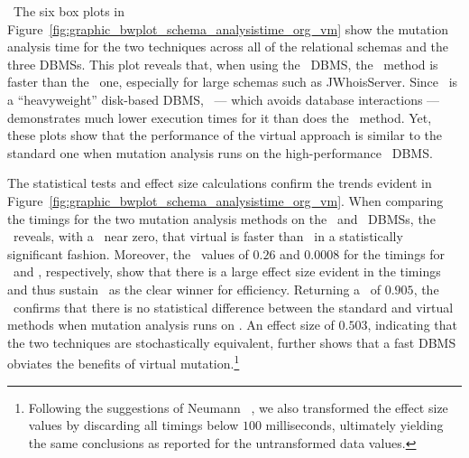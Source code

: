 

~The six box plots in Figure~\ref{fig:graphic_bwplot_schema_analysistime_org_vm} show the mutation analysis time for the two techniques across all of the relational schemas and the three DBMSs. This plot reveals that, when using the \HyperSQL~DBMS, the \virtual~method is faster than the \Original~one, especially for large schemas such as JWhoisServer. Since \Postgres~is a ``heavyweight'' disk-based DBMS, \vma~--- which avoids database interactions --- demonstrates much lower execution times for it than does the \Original~method. Yet, these plots show that the performance of the virtual approach is similar to the standard one when mutation analysis runs on the high-performance \sqlite~DBMS.


The statistical tests and effect size calculations confirm the trends evident in Figure~\ref{fig:graphic_bwplot_schema_analysistime_org_vm}. When comparing the timings for the two mutation analysis methods on the \HyperSQL~and \Postgres~DBMSs, the \wilcoxon~reveals, with a \pvalue~near zero, that virtual is faster than \Original~in a statistically significant fashion. Moreover, the \atwelve~values of $0.26$ and $0.0008$ for the timings for \HyperSQL~and \Postgres, respectively, show that there is a large effect size evident in the timings and thus sustain \vma~as the clear winner for efficiency. Returning a \pvalue~of $0.905$, the \wilcoxon~confirms that there is no statistical difference between the standard and virtual methods when mutation analysis runs on \sqlite. An effect size of $0.503$, indicating that the two techniques are stochastically equivalent, further shows that a fast DBMS obviates the benefits of virtual mutation.\footnote{{\scriptsize Following the suggestions of Neumann \etal~\cite{Neumann2015}, we also transformed the effect size values by discarding all timings below $100$ milliseconds, ultimately yielding the same conclusions as reported for the untransformed data values.}}

